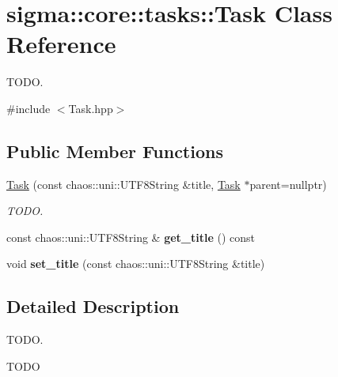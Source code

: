 \hypertarget{classsigma_1_1core_1_1tasks_1_1_task}{\section{sigma\-:\-:core\-:\-:tasks\-:\-:Task Class Reference}
\label{classsigma_1_1core_1_1tasks_1_1_task}
}


T\-O\-D\-O.  




{\ttfamily \#include $<$Task.\-hpp$>$}

\subsection*{Public Member Functions}
\begin{DoxyCompactItemize}
\item 
\hyperlink{classsigma_1_1core_1_1tasks_1_1_task_a0e0bb9899317a89bf9e49bd04513bc04}{Task} (const chaos\-::uni\-::\-U\-T\-F8\-String \&title, \hyperlink{classsigma_1_1core_1_1tasks_1_1_task}{Task} $\ast$parent=nullptr)
\begin{DoxyCompactList}\small\item\em T\-O\-D\-O. \end{DoxyCompactList}\item 
\hypertarget{classsigma_1_1core_1_1tasks_1_1_task_a8fd41c73909654ee57670b45c273a65b}{const chaos\-::uni\-::\-U\-T\-F8\-String \& {\bfseries get\-\_\-title} () const }\label{classsigma_1_1core_1_1tasks_1_1_task_a8fd41c73909654ee57670b45c273a65b}

\item 
\hypertarget{classsigma_1_1core_1_1tasks_1_1_task_a1f17b3e1f7b444d6a73f5391e929adc5}{void {\bfseries set\-\_\-title} (const chaos\-::uni\-::\-U\-T\-F8\-String \&title)}\label{classsigma_1_1core_1_1tasks_1_1_task_a1f17b3e1f7b444d6a73f5391e929adc5}

\end{DoxyCompactItemize}


\subsection{Detailed Description}
T\-O\-D\-O. 

T\-O\-D\-O 

